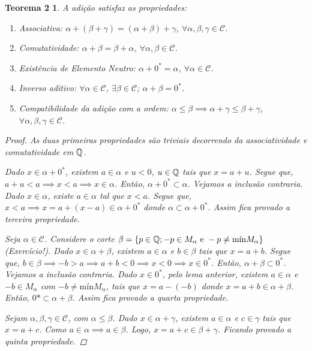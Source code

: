 \documentclass[a4paper,12pt]{article}
\newtheorem*{t2}{Teorema 2}
\begin{document}
	\begin{t2}
		
		A adição satisfaz as propriedades:
		
		\begin{enumerate}		
		
			\item Associativa: $\alpha + (\beta + \gamma) = (\alpha + \beta) + \gamma$, $\forall \alpha, \beta, \gamma \in \mathcal C$.	
			\item Comutatividade: $\alpha + \beta = \beta + \alpha$, $\forall \alpha, \beta \in \mathcal C$.	
			\item Existência de Elemento Neutro: $\alpha + 0^* = \alpha$, $\forall \alpha \in \mathcal C$.
			\item Inverso aditivo: $\forall \alpha \in \mathcal C$, $\exists \beta \in \mathcal C$; $\alpha + \beta = 0^*$.
			\item Compatibilidade da adição com a ordem: $\alpha \leq \beta \implies \alpha + \gamma \leq \beta + \gamma$, $\forall \alpha, \beta, \gamma \in \mathcal C$.	
			
		\end{enumerate}
	
	\begin{proof}
		
		As duas primeiras propriedades são triviais decorrendo da associatividade e comutatividade em $\Bbb Q$.
		
		Dado $x \in \alpha + 0^*$, existem $a \in \alpha$ e $u < 0$, $u \in \Bbb Q$ tais que $x = a + u$. Segue que, $a + u < a \implies x < a \implies x \in \alpha$. Então, $\alpha + 0^* \subset \alpha$. Vejamos a inclusão contraria. Dado $x \in \alpha$, existe $a \in \alpha$ tal que $x < a$. Segue que, $x < a \implies x = a + (x - a) \in \alpha + 0^*$ donde $\alpha \subset \alpha + 0^*$. Assim fica provado a terceira propriedade.
		
		Seja $\alpha \in \mathcal C$. Considere o corte $\beta = \{p \in \Bbb Q; -p \in M_{\alpha} \ \text{e} \ -p \neq \text{mín}M_{\alpha}\}$ (Exercício!). Dado $x \in \alpha + \beta$, existem $a \in \alpha$ e $b \in \beta$ tais que $x = a + b$. Segue que, $b \in \beta \implies -b > a \implies a + b < 0 \implies x < 0 \implies x \in 0^*$. Então, $\alpha + \beta \subset 0^*$. Vejamos a inclusão contraria. Dado $x \in 0^*$, pelo lema anterior, existem $a \in \alpha$ e $-b \in M_{\alpha}$ com $-b \neq \text{mín}M_{\alpha}$, tais que $x = a - (-b)$ donde $x = a + b \in \alpha + \beta$. Então, $0* \subset \alpha + \beta$. Assim fica provado a quarta propriedade.
		
		Sejam $\alpha, \beta, \gamma \in \mathcal C$, com $\alpha \leq \beta$. Dado $x \in \alpha + \gamma$, existem $a \in \alpha$ e $c \in \gamma$ tais que $x = a + c$. Como $a \in \alpha \implies a \in \beta$. Logo, $x = a + c \in \beta + \gamma$. Ficando provado a quinta propriedade.
		
	\end{proof}

	\end{t2}
\end{document}
